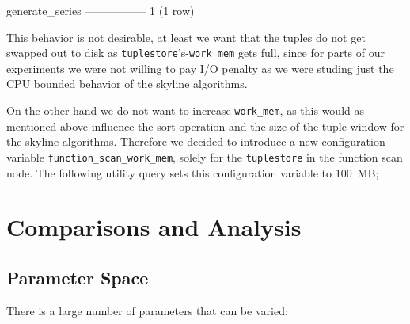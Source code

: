 \begin{interactive}
 generate_series
-----------------
               1
(1 row)
\end{interactive}

This behavior is not desirable, at least we want that the tuples do
not get swapped out to disk as
\texttt{tuplestore}'s-\texttt{work\_mem} gets full, since for parts
of our experiments we were not willing to pay I/O penalty as we were
studing just the CPU bounded behavior of the skyline algorithms.

On the other hand we do not want to increase \texttt{work\_mem}, as
this would as mentioned above influence the sort operation and the size
of the tuple window for the skyline algorithms. Therefore we decided
to introduce a new configuration variable
\texttt{function\_scan\_work\_mem}, solely for the \texttt{tuplestore}
in the function scan node. The following utility query sets this
configuration variable to 100~MB;

\begin{interactive}
\end{interactive}


\clearpage %

\section{Comparisons and Analysis}

\subsection{Parameter Space}

There is a large number of parameters that can be varied:

